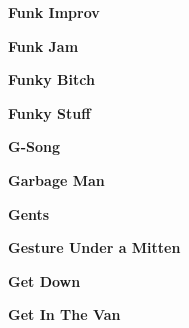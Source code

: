 \begin{center}\textbf{Funk Improv}\end{center}
\newline
\vspace{10pt} 
\begin{center}\textbf{Funk Jam}\end{center}
\newline
\vspace{10pt} 
\begin{center}\textbf{Funky Bitch}\end{center}
\newline
\vspace{10pt} 
\begin{center}\textbf{Funky Stuff}\end{center}
\newline
\vspace{10pt} 
\begin{center}\textbf{G-Song}\end{center}
\newline
\vspace{10pt} 
\begin{center}\textbf{Garbage Man}\end{center}
\newline
\vspace{10pt} 
\begin{center}\textbf{Gents}\end{center}
\newline
\vspace{10pt} 
\begin{center}\textbf{Gesture Under a Mitten}\end{center}
\newline
\vspace{10pt} 
\begin{center}\textbf{Get Down}\end{center}
\newline
\vspace{10pt} 
\begin{center}\textbf{Get In The Van}\end{center}
\newline
